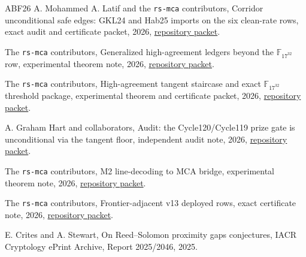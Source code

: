 \documentclass[11pt,a4paper]{amsart}
\numberwithin{equation}{section}
\theoremstyle{remark}
\begin{document}
\begin{thebibliography}{ABF26}
A. Mohammed A. Latif and the \texttt{rs-mca} contributors,
\newblock Corridor unconditional safe edges: GKL24 and Hab25 imports on the six clean-rate rows,
\newblock exact audit and certificate packet, 2026,
\newblock \href{https://github.com/przchojecki/rs-mca/blob/5ecb9ab538a0a57dcb81018b17f32849049fb998/experimental/data/certificates/corridor-unconditional-safe-edges/README.md}{repository packet}.

The \texttt{rs-mca} contributors,
\newblock Generalized high-agreement ledgers beyond the $\mathbb F_{17^{32}}$ row,
\newblock experimental theorem note, 2026,
\newblock \href{https://github.com/przchojecki/rs-mca/blob/5ecb9ab538a0a57dcb81018b17f32849049fb998/experimental/data/generalized-ledgers/generalized_high_agreement_ledgers_summary.md}{repository packet}.

The \texttt{rs-mca} contributors,
\newblock High-agreement tangent staircase and exact $\mathbb F_{17^{32}}$ threshold package,
\newblock experimental theorem and certificate packet, 2026,
\newblock \href{https://github.com/przchojecki/rs-mca/blob/5ecb9ab538a0a57dcb81018b17f32849049fb998/experimental/notes/thresholds/high_agreement_threshold_package.md}{repository packet}.

A. Graham Hart and collaborators,
\newblock Audit: the Cycle120/Cycle119 prize gate is unconditional via the tangent floor,
\newblock independent audit note, 2026,
\newblock \href{https://github.com/przchojecki/rs-mca/blob/5ecb9ab538a0a57dcb81018b17f32849049fb998/experimental/notes/audits/audit_prize_gate_unconditional_via_tangent.md}{repository packet}.

The \texttt{rs-mca} contributors,
\newblock M2 line-decoding to MCA bridge,
\newblock experimental theorem note, 2026,
\newblock \href{https://github.com/przchojecki/rs-mca/blob/5ecb9ab538a0a57dcb81018b17f32849049fb998/experimental/notes/m2/m2_line_decoding_mca_bridge.md}{repository packet}.

The \texttt{rs-mca} contributors,
\newblock Frontier-adjacent v13 deployed rows,
\newblock exact certificate note, 2026,
\newblock \href{https://github.com/przchojecki/rs-mca/blob/5ecb9ab538a0a57dcb81018b17f32849049fb998/experimental/notes/frontier-adjacent/frontier_adjacent_v13_rows_v1.md}{repository packet}.

E. Crites and A. Stewart,
\newblock On Reed--Solomon proximity gaps conjectures,
\newblock IACR Cryptology ePrint Archive, Report 2025/2046, 2025.


\end{thebibliography}
\end{document}
